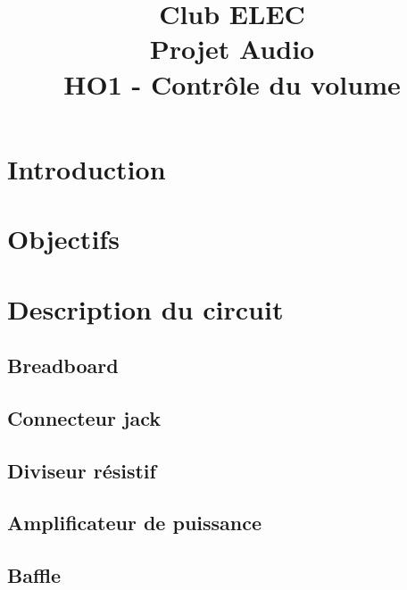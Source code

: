 \documentclass[a4paper,10pt,twoside]{article}
\title{	
	\vspace{2.5cm}
	\normalfont \normalsize 
	\huge Club ELEC\\ 
	\vspace{2.5cm}
	\huge Projet Audio\\
	\vspace{.25cm}
	\Large HO1 - Contrôle du volume
	\vspace{2.5cm}
	\centering
}
\begin{document}
\renewcommand{\figurename}{Figure}
\renewcommand{\thepage}{\roman{page}}
\setcounter{page}{1}

\maketitle
\newpage
{}
\pagestyle{main}

\newpage
\null
\thispagestyle{empty}
\newpage
\clearpage

\setcounter{page}{1}

\section*{Introduction}


\section*{Objectifs}


\newpage 

\section*{Description du circuit}


\subsection*{Breadboard}


\subsection*{Connecteur jack}


\subsection*{Diviseur résistif}


\newpage

\subsection*{Amplificateur de puissance}


\subsection*{Baffle}

\end{document}
